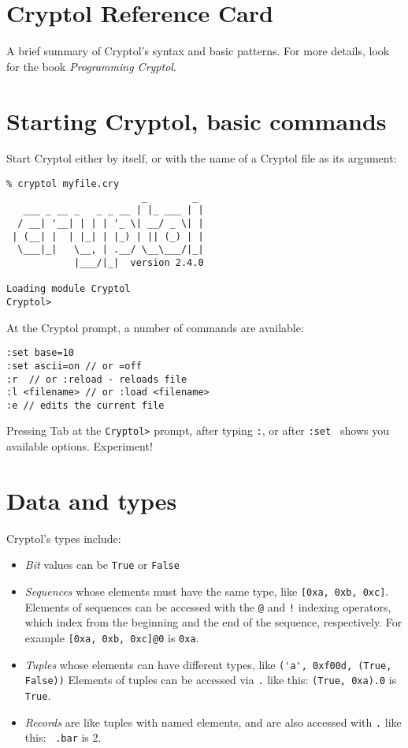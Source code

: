 \documentclass[9pt,letter]{article}
\begin{document}
\section{Cryptol Reference Card}
A brief summary of Cryptol's syntax and basic patterns. For more details, look for the book {\it Programming Cryptol}.
\section{Starting Cryptol, basic commands}
Start Cryptol either by itself, or with the name of a Cryptol file as its argument:
\begin{verbatim}
% cryptol myfile.cry
                        _        _
   ___ _ __ _   _ _ __ | |_ ___ | |
  / __| '__| | | | '_ \| __/ _ \| |
 | (__| |  | |_| | |_) | || (_) | |
  \___|_|   \__, | .__/ \__\___/|_|
            |___/|_|  version 2.4.0

Loading module Cryptol
Cryptol>
\end{verbatim}

At the Cryptol prompt, a number of commands are available:
\begin{verbatim}
:set base=10
:set ascii=on // or =off
:r  // or :reload - reloads file
:l <filename> // or :load <filename>
:e // edits the current file
\end{verbatim}
Pressing Tab at the \verb|Cryptol>| prompt, after typing \verb|:|, or after \verb|:set | shows you available options. Experiment!

\section{Data and types}
Cryptol's types include:
\begin{itemize}
\item{\it Bit} values can be \verb|True| or \verb|False|
\item{\it Sequences} whose elements must have the same type, like
    \verb+[0xa, 0xb, 0xc]+. Elements of sequences can be accessed with
        the \verb|@| and \verb|!| indexing operators, which index from
        the beginning and the end of the sequence, respectively. For
        example \texttt{[0xa, 0xb, 0xc]@0} is \verb+0xa+.
\item{\it Tuples} whose elements can have different types, like \verb+('a', 0xf00d, (True, False))+ Elements of tuples can be accessed via \verb+.+ like this: \texttt{(True, 0xa).0} is \verb+True+.
\item{\it Records} are like tuples with named elements, and are also accessed with \verb+.+ like this:  \texttt{ .bar} is 2.
\end{itemize}
\end{document}
